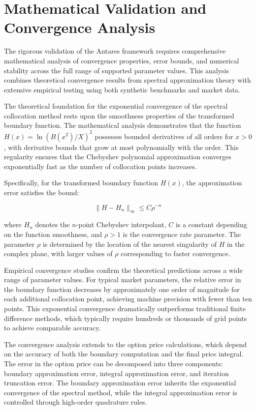 \documentclass[
  american,
  11pt,
  11pt,
  letterpaper,
  onecolumn]{article}
\begin{document}
\section{Mathematical Validation and Convergence
Analysis}\label{mathematical-validation-and-convergence-analysis}

The rigorous validation of the Antares framework requires comprehensive
mathematical analysis of convergence properties, error bounds, and
numerical stability across the full range of supported parameter values.
This analysis combines theoretical convergence results from spectral
approximation theory with extensive empirical testing using both
synthetic benchmarks and market data.

The theoretical foundation for the exponential convergence of the
spectral collocation method rests upon the smoothness properties of the
transformed boundary function. The mathematical analysis demonstrates
that the function \(H(x) = \ln(B(x^2)/X)^2\) possesses bounded
derivatives of all orders for \(x > 0\), with derivative bounds that
grow at most polynomially with the order. This regularity ensures that
the Chebyshev polynomial approximation converges exponentially fast as
the number of collocation points increases.

Specifically, for the transformed boundary function \(H(x)\), the
approximation error satisfies the bound:

\[\|H - H_n\|_{\infty} \leq C \rho^{-n}\]

where \(H_n\) denotes the \(n\)-point Chebyshev interpolant, \(C\) is a
constant depending on the function smoothness, and \(\rho > 1\) is the
convergence rate parameter. The parameter \(\rho\) is determined by the
location of the nearest singularity of \(H\) in the complex plane, with
larger values of \(\rho\) corresponding to faster convergence.

Empirical convergence studies confirm the theoretical predictions across
a wide range of parameter values. For typical market parameters, the
relative error in the boundary function decreases by approximately one
order of magnitude for each additional collocation point, achieving
machine precision with fewer than ten points. This exponential
convergence dramatically outperforms traditional finite difference
methods, which typically require hundreds or thousands of grid points to
achieve comparable accuracy.

The convergence analysis extends to the option price calculations, which
depend on the accuracy of both the boundary computation and the final
price integral. The error in the option price can be decomposed into
three components: boundary approximation error, integral approximation
error, and iteration truncation error. The boundary approximation error
inherits the exponential convergence of the spectral method, while the
integral approximation error is controlled through high-order quadrature
rules.
\end{document}
